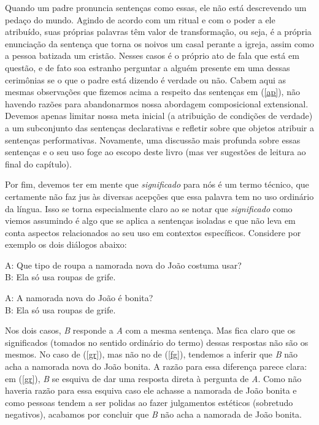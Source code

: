 \n Quando um padre pronuncia sen\-ten\-ças como essas, ele não
está descrevendo um pedaço do mundo. Agindo de acordo com um
ritual e com o poder a ele atribuído, suas próprias palavras têm
valor de transforma\-ção, ou seja, é a própria enuncia\-ção da
sentença que torna os noivos um casal perante a igreja, assim como
a pessoa batizada um cristão. Nesses casos é o próprio ato de fala
que está em questão, e de fato soa estranho perguntar a alguém
presente em uma dessas cerimônias se o que o padre está dizendo é
verdade ou não. Cabem aqui as mesmas observa\-çõ\-es que fizemos
acima a respeito das sen\-ten\-ças em (\ref{ap}), não havendo
razões para abandonarmos nossa abordagem composicional
extensional. Devemos apenas limitar nossa meta inicial (a
atribui\-ção de condi\-çõ\-es de verdade) a um subconjunto das
sen\-ten\-ças declarativas e refletir sobre que objetos atribuir a
sen\-ten\-ças performativas. Novamente, uma discussão mais
profunda sobre essas sen\-ten\-ças e o seu uso foge ao escopo
deste livro (mas ver sugestões de leitura ao final do capítulo).

Por fim, devemos ter em mente que \textit{significado} para nós é
um termo técnico, que certamente não faz jus às diversas
acep\-çõ\-es que essa palavra tem no uso ordinário da língua. Isso
se torna especialmente claro ao se notar que \textit{significado}
como viemos assumindo é algo que se aplica a sen\-ten\-ças
isoladas e que não leva em conta aspectos relacionados ao seu uso
em contextos específicos. Considere por exemplo os dois diálogos
abaixo:

\begin{exe}
    \ex A: Que tipo de roupa a namorada nova do João costuma usar?\\
    B: Ela só usa roupas de grife. \label{fg}
\end{exe}

\begin{exe}
    \ex A: A namorada nova do João é bonita?\\
    B: Ela só usa roupas de grife. \label{gr}
\end{exe}

\n Nos dois casos, \textit{B} responde a \textit{A} com a mesma
sentença. Mas fica claro que os significados (tomados no sentido
ordinário do termo) dessas respostas não são os mesmos. No caso de
(\ref{gr}), mas não no de (\ref{fg}), tendemos a inferir que
\textit{B} não acha a namorada nova do João bonita. A razão para
essa diferença parece clara: em (\ref{gr}), \textit{B} se esquiva
de dar uma resposta direta à pergunta de \textit{A}. Como não
haveria razão para essa esquiva caso ele achasse a namorada de
João bonita e como pessoas tendem a ser polidas ao fazer
julgamentos estéticos (sobretudo negativos), acabamos por concluir
que \textit{B} não acha a namorada de João bonita.

